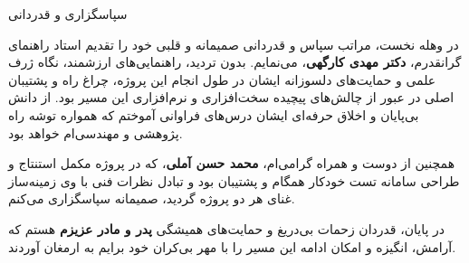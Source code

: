 
\newpage
\thispagestyle{empty}

\begin{center}
    \vspace*{1cm}
    {\titr\Large سپاسگزاری و قدردانی}\\[1.2cm]
\end{center}

\noindent
در وهله نخست، مراتب سپاس و قدردانی صمیمانه و قلبی خود را تقدیم استاد راهنمای گرانقدرم، \textbf{دکتر مهدی کارگهی}، می‌نمایم. بدون تردید، راهنمایی‌های ارزشمند، نگاه ژرف علمی و حمایت‌های دلسوزانه ایشان در طول انجام این پروژه، چراغ راه و پشتیبان اصلی در عبور از چالش‌های پیچیده سخت‌افزاری و نرم‌افزاری این مسیر بود. از دانش بی‌پایان و اخلاق حرفه‌ای ایشان درس‌های فراوانی آموختم که همواره توشه راه پژوهشی و مهندسی‌ام خواهد بود.

\vspace{0.8cm}
\noindent
همچنین از دوست و همراه گرامی‌ام، \textbf{محمد حسن آملی}، که در پروژه مکمل استنتاج  و طراحی سامانه تست خودکار همگام و پشتیبان بود و تبادل نظرات فنی با وی زمینه‌ساز غنای هر دو پروژه گردید، صمیمانه سپاسگزاری می‌کنم.

\vspace{0.8cm}
\noindent
در پایان، قدردان زحمات بی‌دریغ و حمایت‌های همیشگی \textbf{پدر و مادر عزیزم} هستم که آرامش، انگیزه و امکان ادامه این مسیر را با مهر بی‌کران خود برایم به ارمغان آوردند.
